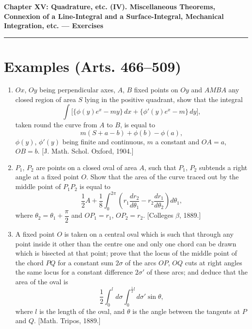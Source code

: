 \documentclass[11pt, a4paper]{article}
\newcommand{\source}[1]{\hfill\textnormal{[#1]}}
\begin{document}
\newpage

\begin{center}
    {\LARGE \bfseries \color{accent} Chapter XV: Quadrature, etc. (IV). Miscellaneous Theorems, Connexion of a Line-Integral and a Surface-Integral, Mechanical Integration, etc. --- Exercises}\\
    \vspace{0.2cm}
    {\color{accent}\rule{0.55\linewidth}{0.8pt}}
\end{center}
\vspace{0.35cm}

\section*{Examples (Arts. 466--509)}

\begin{enumerate}[leftmargin=2em]

\item $Ox$, $Oy$ being perpendicular axes, $A$, $B$ fixed points on $Oy$ and $AMBA$ any closed region of area $S$ lying in the positive quadrant, show that the integral
\[
\int\big[\{\phi(y)e^x-my\}\,dx+\{\phi'(y)e^x-m\}\,dy\big],
\]
taken round the curve from $A$ to $B$, is equal to
\[
m(S+a-b)+\phi(b)-\phi(a),
\]
$\phi(y)$, $\phi'(y)$ being finite and continuous, $m$ a constant and $OA=a$, $OB=b$. \source{J. Math. Schol. Oxford, 1904.}

\item $P_1$, $P_2$ are points on a closed oval of area $A$, such that $P_1$, $P_2$ subtends a right angle at a fixed point $O$. Show that the area of the curve traced out by the middle point of $P_1P_2$ is equal to
\[
\frac12A+\frac18\int_0^{2\pi}\left(r_1\frac{dr_2}{d\theta_1}-r_2\frac{dr_1}{d\theta_2}\right)d\theta_1,
\]
where $\theta_2=\theta_1+\dfrac{\pi}{2}$ and $OP_1=r_1$, $OP_2=r_2$. \source{Colleges $\beta$, 1889.}

\item A fixed point $O$ is taken on a central oval which is such that through any point inside it other than the centre one and only one chord can be drawn which is bisected at that point; prove that the locus of the middle point of the chord $PQ$ for a constant sum $2\sigma$ of the arcs $OP$, $OQ$ cuts at right angles the same locus for a constant difference $2\sigma'$ of these arcs; and deduce that the area of the oval is
\[
\frac12\int_0^l d\sigma\int_0^{\frac12l}d\sigma'\sin\theta,
\]
where $l$ is the length of the oval, and $\theta$ is the angle between the tangents at $P$ and $Q$. \source{Math. Tripos, 1889.}


\end{enumerate}
\end{document}
